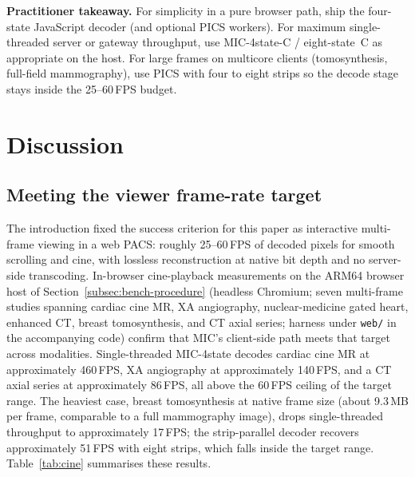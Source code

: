 \documentclass[journal]{IEEEtran}
\begin{document}
\textbf{Practitioner takeaway.} For simplicity in a pure browser path, ship the
four-state JavaScript decoder (and optional PICS workers). For maximum
single-threaded server or gateway throughput, use MIC-4state-C / eight-state~C
as appropriate on the host. For large frames on multicore clients (tomosynthesis,
full-field mammography), use PICS with four to eight strips so the decode stage
stays inside the 25--60\,FPS budget.

\section{Discussion}
\label{sec:discussion}

\subsection{Meeting the viewer frame-rate target}
\label{sec:clinical-workflow}

The introduction fixed the success criterion for this paper as interactive
multi-frame viewing in a web PACS: roughly 25--60\,FPS of decoded pixels for
smooth scrolling and cine, with lossless reconstruction at native bit depth and
no server-side transcoding. In-browser cine-playback measurements on the ARM64
browser host of Section~\ref{subsec:bench-procedure} (headless Chromium; seven
multi-frame studies spanning cardiac cine MR, XA angiography, nuclear-medicine
gated heart, enhanced CT, breast tomosynthesis, and CT axial series; harness
under \texttt{web/} in the accompanying code) confirm that MIC's client-side path
meets that target across modalities. Single-threaded MIC-4state decodes cardiac
cine MR at approximately 460\,FPS, XA angiography at approximately 140\,FPS, and
a CT axial series at approximately 86\,FPS, all above the 60\,FPS ceiling of the
target range. The heaviest case, breast tomosynthesis at native frame size
(about 9.3\,MB per frame, comparable to a full mammography image), drops
single-threaded throughput to approximately 17\,FPS; the strip-parallel decoder
recovers approximately 51\,FPS with eight strips, which falls inside the target
range. Table~\ref{tab:cine} summarises these results.
\end{document}

